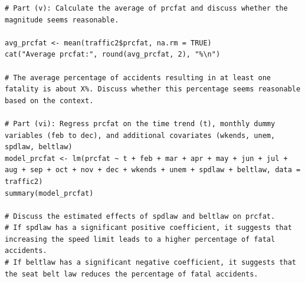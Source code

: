 \documentclass[12pt]{article}
\begin{document}
\begin{enumerate}
{\begin{lstlisting}
# Part (v): Calculate the average of prcfat and discuss whether the magnitude seems reasonable.

avg_prcfat <- mean(traffic2$prcfat, na.rm = TRUE)
cat("Average prcfat:", round(avg_prcfat, 2), "%\n")

# The average percentage of accidents resulting in at least one fatality is about X%. Discuss whether this percentage seems reasonable based on the context.

# Part (vi): Regress prcfat on the time trend (t), monthly dummy variables (feb to dec), and additional covariates (wkends, unem, spdlaw, beltlaw)
model_prcfat <- lm(prcfat ~ t + feb + mar + apr + may + jun + jul + aug + sep + oct + nov + dec + wkends + unem + spdlaw + beltlaw, data = traffic2)
summary(model_prcfat)

# Discuss the estimated effects of spdlaw and beltlaw on prcfat.
# If spdlaw has a significant positive coefficient, it suggests that increasing the speed limit leads to a higher percentage of fatal accidents.
# If beltlaw has a significant negative coefficient, it suggests that the seat belt law reduces the percentage of fatal accidents.


\end{lstlisting}
}


\end{enumerate}
\end{document}
